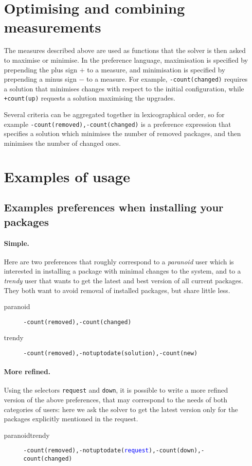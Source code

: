 \documentclass{article}
\newcommand{\solverpref}[1]{{\texttt{#1}}}
\begin{document}
\section{Optimising and combining measurements}

The measures described above are used as functions that the solver is then asked to maximise or minimise.
In the preference language, maximisation is specified by prepending the plus sign $+$ to a measure, and
minimisation is specified by prepending a minus sign $-$ to a measure. For example, \texttt{-count(changed)}
requires a solution that minimises changes with respect to the initial configuration, while \texttt{+count(up)}
requests a solution maximising the upgrades.

Several criteria can be aggregated together in lexicographical order, so for
example \texttt{-count(removed),-count(changed)} is a preference expression
that specifies a solution which minimises the number of removed packages,
and then minimises the number of changed ones.

\section{Examples of usage}



\subsection{Examples preferences when installing your packages}
\paragraph{Simple.} Here are two preferences that roughly correspond to a \emph{paranoid} user which is interested in installing a package with minimal changes to the system,
and to a \emph{trendy} user that wants to get the latest and best version of all current packages. They both want to avoid removal of installed packages, but share little less.
\begin{description}
\item[paranoid] \solverpref{-count(removed),-count(changed)}
\item[trendy] \solverpref{-count(removed),-notuptodate(solution),-count(new)}
\end{description}

\paragraph{More refined.} Using the selectors \texttt{request} and \texttt{down}, it is possible to write a more refined version of the above preferences, that may
correspond to the needs of both categories of users: here we ask the solver to get the latest version only for the packages explicitly mentioned in the request.
\begin{description}
\item[paranoidtrendy] \solverpref{-count(removed),-notuptodate(\textcolor{blue}{request}),-count(down),-count(changed)}
\end{description}
\end{document}

